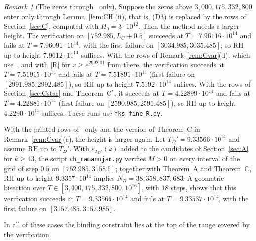\documentclass{amsart}
\theoremstyle{definition}
\theoremstyle{remark}
\newtheorem{remark}[theorem]{Remark}
\theoremstyle{plain}
\numberwithin{equation}{section}
\newcommand{\eps}{\varepsilon}
\newcommand{\NN}{38{,}358{,}837{,}683}
\newcommand{\HRH}{3{,}000{,}175{,}332{,}800}
\newcommand{\TDold}{9.3357\cdot10^{14}}
\newcommand{\TDolduse}{9.33566\cdot10^{14}}
\newcommand{\Cstar}{C$^*$}
\begin{document}
\begin{remark}[The zeros through~\cite{CH25} only]\label{rem:Dzeros}
Suppose the zeros above $\HRH$ enter only through Lemma~\ref{lem:CH}(ii), that is, (D3) is replaced by the rows of Section~\ref{sec:C}, computed with $H_0=3\cdot10^{12}$. Then the method needs a larger height. The verification on $[752.985,L_C+0.5]$ succeeds at $T=7.96116\cdot10^{14}$ and fails at $T=7.96091\cdot10^{14}$, with the first failure on $[3034.985,3035.485]$; so RH up to height $7.9612\cdot10^{14}$ suffices. With the rows of Remark~\ref{rem:Cvar}(d), which use~\cite{Bel24}, and with \eqref{R} for $x\ge e^{2992.01}$ from there, the verification succeeds at $T=7.51915\cdot10^{14}$ and fails at $T=7.51891\cdot10^{14}$ (first failure on $[2991.985,2992.485]$), so RH up to height $7.5192\cdot10^{14}$ suffices. With the rows of Section~\ref{sec:Cstar} and Theorem~\Cstar, it succeeds at $T=4.22899\cdot10^{14}$ and fails at $T=4.22886\cdot10^{14}$ (first failure on $[2590.985,2591.485]$), so RH up to height $4.2290\cdot10^{14}$ suffices. These runs use \texttt{fks\_fine\_R.py}.

With the printed rows of~\cite{FKS23} only and the version of Theorem~C in Remark~\ref{rem:Cvar}(c), the height is larger again. Let $T_D'=\TDolduse$ and assume RH up to $T_D'$. With $\eps_{T_D'}(k)$ added to the candidates of Section~\ref{sec:A} for $k\ge43$, the script \texttt{ch\_ramanujan.py} verifies $M>0$ on every interval of the grid of step $0.5$ on $[752.985,3158.5]$; together with Theorem~A and Theorem~C, RH up to height $\TDold$ implies $N_R=\NN$. A geometric bisection over $T\in[\HRH,10^{16}]$, with $18$ steps, shows that this verification succeeds at $T=\TDolduse$ and fails at $T=9.33537\cdot10^{14}$, with the first failure on $[3157.485,3157.985]$.

In all of these cases the binding constraint lies at the top of the range covered by the verification.
\end{remark}
\end{document}
